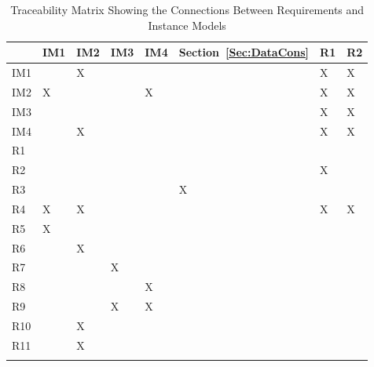 \documentclass[12pt]{article}
\begin{document}
\begin{longtable}{l l l l l l l l}
\toprule
 & IM1 & IM2 & IM3 & IM4 & Section~\ref{Sec:DataCons} & R1 & R2
\\
\midrule
IM1 &  & X &  &  &  & X & X
\\
IM2 & X &  &  & X &  & X & X
\\
IM3 &  &  &  &  &  & X & X
\\
IM4 &  & X &  &  &  & X & X
\\
R1 &  &  &  &  &  &  & 
\\
R2 &  &  &  &  &  & X & 
\\
R3 &  &  &  &  & X &  & 
\\
R4 & X & X &  &  &  & X & X
\\
R5 & X &  &  &  &  &  & 
\\
R6 &  & X &  &  &  &  & 
\\
R7 &  &  & X &  &  &  & 
\\
R8 &  &  &  & X &  &  & 
\\
R9 &  &  & X & X &  &  & 
\\
R10 &  & X &  &  &  &  & 
\\
R11 &  & X &  &  &  &  & 
\\
\bottomrule
\caption{Traceability Matrix Showing the Connections Between Requirements and Instance Models}
\label{Table:TracMatrShowtheConnBetwRequandInstMode}
\end{longtable}
\end{document}
